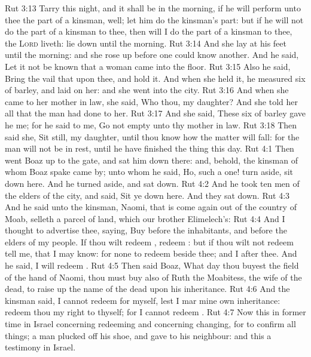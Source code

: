\vs Rut 3:13 Tarry this night, and it shall be in the morning,  if he will perform unto thee the part of a kinsman, well; let him do the kinsman's part: but if he will not do the part of a kinsman to thee, then will I do the part of a kinsman to thee,  the \textsc{Lord} liveth: lie down until the morning.
\vs Rut 3:14 And she lay at his feet until the morning: and she rose up before one could know another. And he said, Let it not be known that a woman came into the floor.
\vs Rut 3:15 Also he said, Bring the vail that  upon thee, and hold it. And when she held it, he measured six  of barley, and laid  on her: and she went into the city.
\vs Rut 3:16 And when she came to her mother in law, she said, Who  thou, my daughter? And she told her all that the man had done to her.
\vs Rut 3:17 And she said, These six  of barley gave he me; for he said to me, Go not empty unto thy mother in law.
\vs Rut 3:18 Then said she, Sit still, my daughter, until thou know how the matter will fall: for the man will not be in rest, until he have finished the thing this day.
\vs Rut 4:1 Then went Boaz up to the gate, and sat him down there: and, behold, the kinsman of whom Boaz spake came by; unto whom he said, Ho, such a one! turn aside, sit down here. And he turned aside, and sat down.
\vs Rut 4:2 And he took ten men of the elders of the city, and said, Sit ye down here. And they sat down.
\vs Rut 4:3 And he said unto the kinsman, Naomi, that is come again out of the country of Moab, selleth a parcel of land, which  our brother Elimelech's:
\vs Rut 4:4 And I thought to advertise thee, saying, Buy  before the inhabitants, and before the elders of my people. If thou wilt redeem , redeem : but if thou wilt not redeem  tell me, that I may know: for  none to redeem  beside thee; and I  after thee. And he said, I will redeem .
\vs Rut 4:5 Then said Boaz, What day thou buyest the field of the hand of Naomi, thou must buy  also of Ruth the Moabitess, the wife of the dead, to raise up the name of the dead upon his inheritance.
\vs Rut 4:6 And the kinsman said, I cannot redeem  for myself, lest I mar mine own inheritance: redeem thou my right to thyself; for I cannot redeem .
\vs Rut 4:7 Now this  in former time in Israel concerning redeeming and concerning changing, for to confirm all things; a man plucked off his shoe, and gave  to his neighbour: and this  a testimony in Israel.
